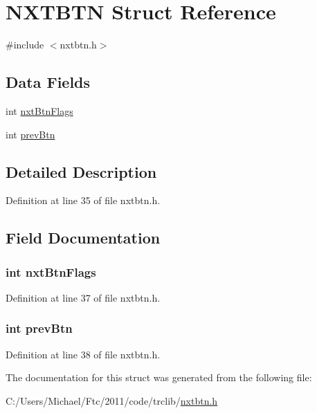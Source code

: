 \hypertarget{struct_n_x_t_b_t_n}{
\section{NXTBTN Struct Reference}
\label{struct_n_x_t_b_t_n}
}


{\ttfamily \#include $<$nxtbtn.h$>$}

\subsection*{Data Fields}
\begin{DoxyCompactItemize}
\item 
int \hyperlink{struct_n_x_t_b_t_n_a4a44c36211c104d738e530bfd396b9fc}{nxtBtnFlags}
\item 
int \hyperlink{struct_n_x_t_b_t_n_ae38072e8b17b730b7e4d9534e5f1547c}{prevBtn}
\end{DoxyCompactItemize}


\subsection{Detailed Description}


Definition at line 35 of file nxtbtn.h.



\subsection{Field Documentation}
\hypertarget{struct_n_x_t_b_t_n_a4a44c36211c104d738e530bfd396b9fc}{
\subsubsection[{nxtBtnFlags}]{\setlength{\rightskip}{0pt plus 5cm}int {\bf nxtBtnFlags}}}
\label{struct_n_x_t_b_t_n_a4a44c36211c104d738e530bfd396b9fc}


Definition at line 37 of file nxtbtn.h.

\hypertarget{struct_n_x_t_b_t_n_ae38072e8b17b730b7e4d9534e5f1547c}{
\subsubsection[{prevBtn}]{\setlength{\rightskip}{0pt plus 5cm}int {\bf prevBtn}}}
\label{struct_n_x_t_b_t_n_ae38072e8b17b730b7e4d9534e5f1547c}


Definition at line 38 of file nxtbtn.h.



The documentation for this struct was generated from the following file:\begin{DoxyCompactItemize}
\item 
C:/Users/Michael/Ftc/2011/code/trclib/\hyperlink{nxtbtn_8h}{nxtbtn.h}\end{DoxyCompactItemize}
